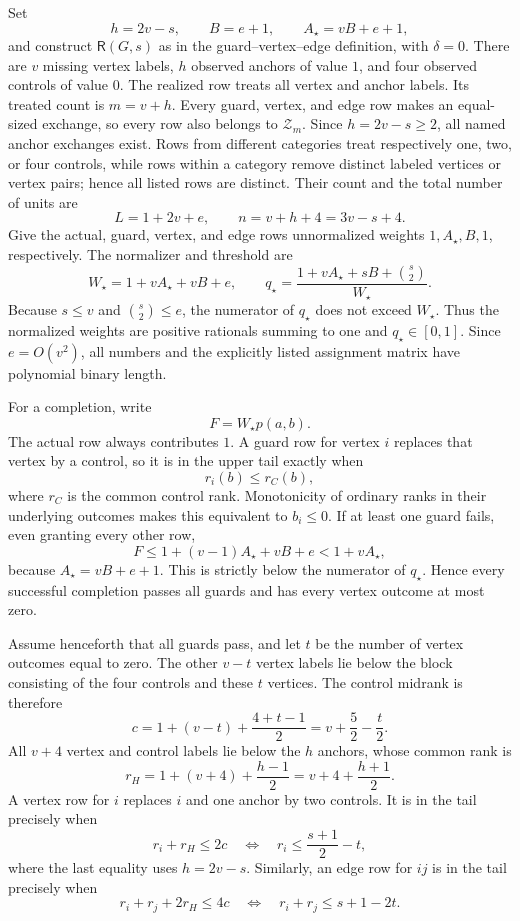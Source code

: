 Set
\[
h=2v-s,\qquad B=e+1,\qquad A_\star=vB+e+1,
\]
and construct \(\mathsf R(G,s)\) as in the guard--vertex--edge definition, with \(\delta=0\).  There are \(v\) missing vertex labels, \(h\) observed anchors of value \(1\), and four observed controls of value \(0\).  The realized row treats all vertex and anchor labels.  Its treated count is \(m=v+h\).  Every guard, vertex, and edge row makes an equal-sized exchange, so every row also belongs to \(\mathcal Z_m\).  Since \(h=2v-s\ge2\), all named anchor exchanges exist.  Rows from different categories treat respectively one, two, or four controls, while rows within a category remove distinct labeled vertices or vertex pairs; hence all listed rows are distinct.  Their count and the total number of units are
\[
L=1+2v+e,
\qquad
n=v+h+4=3v-s+4.
\]
Give the actual, guard, vertex, and edge rows unnormalized weights \(1,A_\star,B,1\), respectively.  The normalizer and threshold are
\[
W_\star=1+vA_\star+vB+e,
\qquad
q_\star=\frac{1+vA_\star+sB+\binom{s}{2}}{W_\star}.
\]
Because \(s\le v\) and \(\binom{s}{2}\le e\), the numerator of \(q_\star\) does not exceed \(W_\star\).  Thus the normalized weights are positive rationals summing to one and \(q_\star\in[0,1]\).  Since \(e=O(v^2)\), all numbers and the explicitly listed assignment matrix have polynomial binary length.

For a completion, write
\[
F=W_\star p(a,b).
\]
The actual row always contributes \(1\).  A guard row for vertex \(i\) replaces that vertex by a control, so it is in the upper tail exactly when
\[
r_i(b)\le r_C(b),
\]
where \(r_C\) is the common control rank.  Monotonicity of ordinary ranks in their underlying outcomes makes this equivalent to \(b_i\le0\).  If at least one guard fails, even granting every other row,
\[
F\le1+(v-1)A_\star+vB+e
<1+vA_\star,
\]
because \(A_\star=vB+e+1\).  This is strictly below the numerator of \(q_\star\).  Hence every successful completion passes all guards and has every vertex outcome at most zero.

Assume henceforth that all guards pass, and let \(t\) be the number of vertex outcomes equal to zero.  The other \(v-t\) vertex labels lie below the block consisting of the four controls and these \(t\) vertices.  The control midrank is therefore
\[
c=1+(v-t)+\frac{4+t-1}{2}=v+\frac52-\frac t2.
\]
All \(v+4\) vertex and control labels lie below the \(h\) anchors, whose common rank is
\[
r_H=1+(v+4)+\frac{h-1}{2}=v+4+\frac{h+1}{2}.
\]
A vertex row for \(i\) replaces \(i\) and one anchor by two controls.  It is in the tail precisely when
\[
r_i+r_H\le2c
\quad\Longleftrightarrow\quad
r_i\le\frac{s+1}{2}-t,
\]
where the last equality uses \(h=2v-s\).  Similarly, an edge row for \(ij\) is in the tail precisely when
\[
r_i+r_j+2r_H\le4c
\quad\Longleftrightarrow\quad
r_i+r_j\le s+1-2t.
\]

